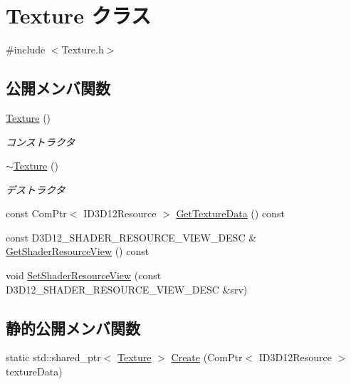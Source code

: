 \hypertarget{class_texture}{}\section{Texture クラス}
\label{class_texture}


{\ttfamily \#include $<$Texture.\+h$>$}

\subsection*{公開メンバ関数}
\begin{DoxyCompactItemize}
\item 
\mbox{\hyperlink{class_texture_a6c275e3f186675ff6ed73ccf970e552f}{Texture}} ()
\begin{DoxyCompactList}\small\item\em コンストラクタ \end{DoxyCompactList}\item 
\mbox{\hyperlink{class_texture_a09c4bcb7462f64c1d20fa69dba3cee8a}{$\sim$\+Texture}} ()
\begin{DoxyCompactList}\small\item\em デストラクタ \end{DoxyCompactList}\item 
const Com\+Ptr$<$ I\+D3\+D12\+Resource $>$ \mbox{\hyperlink{class_texture_a316e50cf43286cd222657cda25ea2c9b}{Get\+Texture\+Data}} () const
\item 
const D3\+D12\+\_\+\+S\+H\+A\+D\+E\+R\+\_\+\+R\+E\+S\+O\+U\+R\+C\+E\+\_\+\+V\+I\+E\+W\+\_\+\+D\+E\+SC \& \mbox{\hyperlink{class_texture_a05b95c1d27164b79e1df38c4a8c3b5a5}{Get\+Shader\+Resource\+View}} () const
\item 
void \mbox{\hyperlink{class_texture_a280d4de4b1e45c3468a72df4fbd7f50d}{Set\+Shader\+Resource\+View}} (const D3\+D12\+\_\+\+S\+H\+A\+D\+E\+R\+\_\+\+R\+E\+S\+O\+U\+R\+C\+E\+\_\+\+V\+I\+E\+W\+\_\+\+D\+E\+SC \&srv)
\end{DoxyCompactItemize}
\subsection*{静的公開メンバ関数}
\begin{DoxyCompactItemize}
\item 
static std\+::shared\+\_\+ptr$<$ \mbox{\hyperlink{class_texture}{Texture}} $>$ \mbox{\hyperlink{class_texture_ab52334c24fcd84853ba455d8ed282ae4}{Create}} (Com\+Ptr$<$ I\+D3\+D12\+Resource $>$ texture\+Data)
\end{DoxyCompactItemize}


